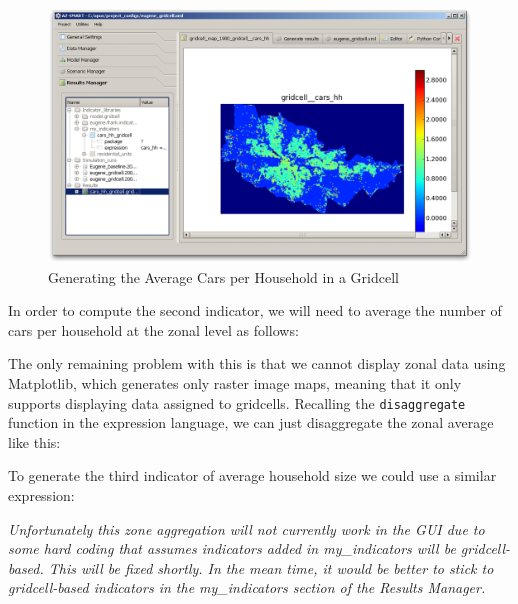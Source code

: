 \begin{figure}[htp]
\begin{center}
\includegraphics[scale=0.4]{graphics/indicator-cars-gridcell-2.png}
\end{center}
\caption{Generating the Average Cars per Household in a Gridcell}
\label{fig:indicator-cars-gridcell-2}
\end{figure}

In order to compute the second indicator, we will need to average the number of cars per household at the zonal level as follows:


The only remaining problem with this is that we cannot display zonal data using Matplotlib, which generates only raster image maps, meaning that it only supports displaying data assigned to gridcells.  Recalling the \verb#disaggregate# function in the expression language, we can just disaggregate the zonal average like this:


To generate the third indicator of average household size we could use a similar expression:


\emph{Unfortunately this zone aggregation will not currently work in the GUI due to some hard coding that assumes indicators added in my\_indicators will be gridcell-based.  This will be fixed shortly.  In the mean time, it would be better to stick to gridcell-based indicators in the my\_indicators section of the Results Manager.}

